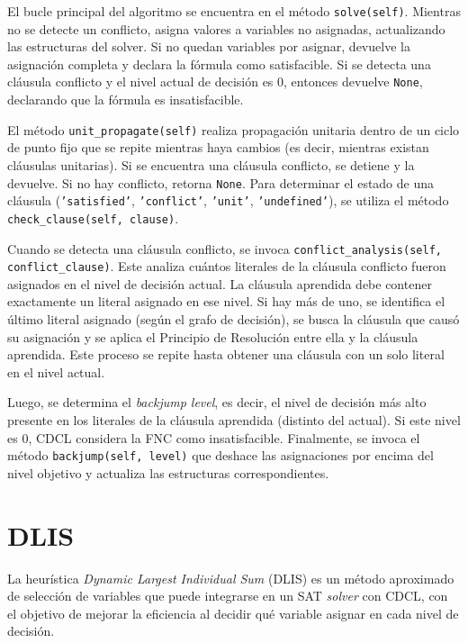El bucle principal del algoritmo se encuentra en el método \texttt{solve(self)}. Mientras no se detecte un conflicto, asigna valores a variables no asignadas, actualizando las estructuras del solver. Si no quedan variables por asignar, devuelve la asignación completa y declara la fórmula como satisfacible. Si se detecta una cláusula conflicto y el nivel actual de decisión es 0, entonces devuelve \texttt{None}, declarando que la fórmula es insatisfacible. 

El método \texttt{unit\_propagate(self)} realiza propagación unitaria dentro de un ciclo de punto fijo que se repite mientras haya cambios (es decir, mientras existan cláusulas unitarias). Si se encuentra una cláusula conflicto, se detiene y la devuelve. Si no hay conflicto, retorna \texttt{None}. Para determinar el estado de una cláusula (\texttt{'satisfied'}, \texttt{'conflict'}, \texttt{'unit'}, \texttt{'undefined'}), se utiliza el método \texttt{check\_clause(self, clause)}.

Cuando se detecta una cláusula conflicto, se invoca \texttt{conflict\_analysis(self, conflict\_clause)}. Este analiza cuántos literales de la cláusula conflicto fueron asignados en el nivel de decisión actual. La cláusula aprendida debe contener exactamente un literal asignado en ese nivel. Si hay más de uno, se identifica el último literal asignado (según el grafo de decisión), se busca la cláusula que causó su asignación y se aplica el Principio de Resolución entre ella y la cláusula aprendida. Este proceso se repite hasta obtener una cláusula con un solo literal en el nivel actual.

Luego, se determina el \textit{backjump level}, es decir, el nivel de decisión más alto presente en los literales de la cláusula aprendida (distinto del actual). Si este nivel es 0, CDCL considera la FNC como insatisfacible. Finalmente, se invoca el método \texttt{backjump(self, level)} que deshace las asignaciones por encima del nivel objetivo y actualiza las estructuras correspondientes.


\section{DLIS}

La heur\'istica \textit{Dynamic Largest Individual Sum} (DLIS) es un m\'etodo aproximado de selecci\'on de variables que puede integrarse en un SAT \textit{solver} con CDCL, con el objetivo de mejorar la eficiencia al decidir qu\'e variable asignar en cada nivel de decisi\'on.

